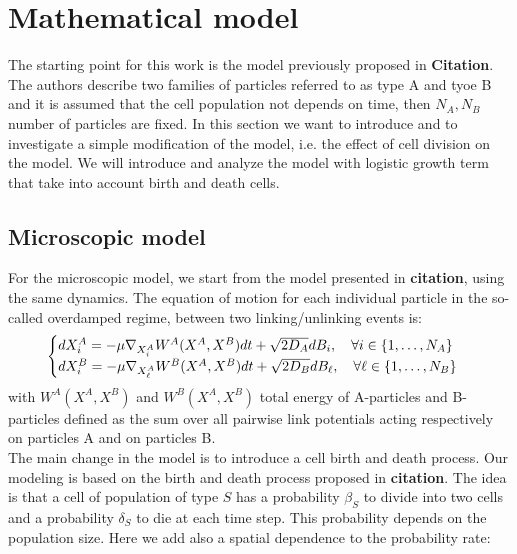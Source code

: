 \section{Mathematical model}
The starting point for this work is the model previously proposed in \textbf{Citation}. The authors describe two families of particles referred to as type A and tyoe B and it is assumed that the cell population not depends on time, then  $N_A, N_B$ number of particles are fixed. In this section we want to introduce and to investigate a simple modification of the model, i.e. the effect of cell division on the model. We will introduce and analyze the model with logistic growth term that take into account birth and death cells.

	\subsection{Microscopic model}
	For the microscopic model, we start from the model presented in \textbf{citation}, using the same dynamics. The equation of motion for each individual particle in the so-called overdamped regime, between two linking/unlinking events is:
	\begin{equation}\label{micro}
	\begin{cases}
	d X_i^{A}=-\mu \nabla_{X_{i}^{A}}W^{A}(X^{A},X^{B})dt + \sqrt{2D_{A}} d B_{i}, \quad \forall i \in\{1, \dots, N_{A}\}
	\\
	d X_i^{B}=-\mu \nabla_{X_{{\ell}}^{A}}W^{B}(X^{A},X^{B})dt + \sqrt{2D_{B}} d B_{{\ell}}, \quad \forall {\ell} \in \{1, \dots, N_{B}\}
	\end{cases}
	\end{equation}
	with $W^A(X^A,X^B)$ and $W^B(X^A,X^B)$ total energy of A-particles and B-particles defined as the sum over all pairwise link potentials acting respectively on particles A and on particles B. \\
	The main change in the model is to introduce a cell birth and death process. Our modeling is based on the birth and death process proposed in \textbf{citation}. The idea is that a cell of population of type $S$ has a probability $\beta_S$ to divide into two cells and a probability $\delta_S$ to die at each time step. This probability depends on the population size. Here we add also a spatial dependence to the probability rate:

